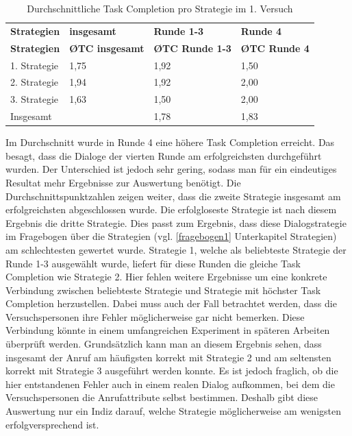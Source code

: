 \documentclass[12pt,a4paper]{scrartcl}
\begin{document}
\begin{longtable}{p{3cm}p{3cm}p{3cm}p{3cm} }
	\label{TCV1}\\
	\caption[Durchschnittliche Task Completion pro Strategie im 1. Versuch]{Durchschnittliche Task Completion pro Strategie im 1. Versuch}\\
	\hline
\textbf{Strategien}&\textbf{insgesamt}&\textbf{Runde 1-3} &\textbf{Runde 4}\\
	\hline
	\endfirsthead
	\hline
	\textbf{Strategien}&\textbf{\O TC insgesamt}&\textbf{\O TC Runde 1-3} &\textbf{\O TC Runde 4}\\
	\hline
	\endhead
1. Strategie & 1,75 & 1,92 & 1,50  \\
2. Strategie & 1,94 & 1,92 & 2,00  \\
3. Strategie & 1,63 & 1,50 & 2,00  \\
Insgesamt & & 1,78 & 1,83 \\ 
\hline
\end{longtable}

Im Durchschnitt wurde in Runde 4 eine höhere Task Completion erreicht. Das besagt, dass die Dialoge der vierten Runde am erfolgreichsten durchgeführt wurden. Der Unterschied ist jedoch sehr gering, sodass man für ein eindeutiges Resultat mehr Ergebnisse zur Auswertung benötigt. Die Durchschnittspunktzahlen zeigen weiter, dass die zweite Strategie insgesamt am erfolgreichsten abgeschlossen wurde. Die erfolgloseste Strategie ist nach diesem Ergebnis die dritte Strategie. Dies passt zum Ergebnis, dass diese Dialogstrategie im Fragebogen über die Strategien (vgl. \ref{fragebogen1} Unterkapitel Strategien) am schlechtesten gewertet wurde. Strategie 1, welche als beliebteste Strategie der Runde 1-3 ausgewählt wurde, liefert für diese Runden die gleiche Task Completion wie Strategie 2. Hier fehlen weitere Ergebnisse um eine konkrete Verbindung zwischen beliebteste Strategie und Strategie mit höchster Task Completion herzustellen. Dabei muss auch der Fall betrachtet werden, dass die Versuchspersonen ihre Fehler möglicherweise gar nicht bemerken. Diese Verbindung könnte in einem umfangreichen Experiment in späteren Arbeiten überprüft werden. 
Grundsätzlich kann man an diesem Ergebnis sehen, dass insgesamt der Anruf am häufigsten korrekt mit Strategie 2 und am seltensten korrekt mit Strategie 3 ausgeführt werden konnte. \newline
Es ist jedoch fraglich, ob die hier entstandenen Fehler auch in einem realen Dialog aufkommen, bei dem die Versuchspersonen die Anrufattribute selbst bestimmen. Deshalb gibt diese Auswertung nur ein Indiz darauf, welche Strategie möglicherweise am wenigsten erfolgversprechend  ist. 
\end{document}
